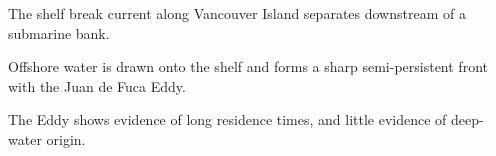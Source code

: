 \documentclass[draft]{agujournal2019}
\begin{document}

\begin{keypoints}
\item The shelf break current along Vancouver Island separates downstream of a submarine bank.
\item Offshore water is drawn onto the shelf and forms a sharp semi-persistent front with the Juan de Fuca Eddy.
\item The Eddy shows evidence of long residence times, and little evidence of deep-water origin.
\end{keypoints}
\end{document}
